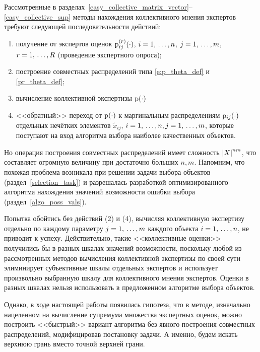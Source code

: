 Рассмотренные в разделах~\ref{easy_collective_matrix_vector}--\ref{easy_collective_sup} методы нахождения коллективного мнения экспертов требуют следующей последовательности действий: 
\begin{enumerate}
\item получение от экспертов оценок ${\mathrm{p}}_{ij}^{(r)}(\cdot)$, $i = 1,\, \ldots, n$, $j = 1,\, \ldots, m$, $r = 1,\, \ldots, R$ (проведение экспертного опроса);
\item построение совместных распределений типа \eqref{e:p_theta_def} и \eqref{pr_theta_def};
\item вычисление коллективной экспертизы  ${\mathrm{p}}(\cdot)$
\item<<обратный>> переход от ${\mathrm{p}}(\cdot)$ к маргинальным распределениям ${\mathrm{p}}_{ij}(\cdot)$ отдельных нечётких элементов $\tilde x_{ij}$, $i = 1,\, \ldots, n, j = 1,\, \ldots, m$, которые поступают на вход алгоритма выбора наиболее качественных объектов. %
\end{enumerate}

Но операция построения  совместных распределений имеет сложность $\left| X \right|^{nm}$, что составляет огромную величину при достаточно больших $n, m$. Напомним, что похожая проблема возникала при решении задачи выбора объектов (раздел~\ref{selection_task}) и разрешалась разработкой оптимизированного алгоритма нахождения значений возможности ошибки выбора (раздел~\ref{algo_poss_vals}). %

Попытка обойтись без действий (2) и (4), вычисляя коллективную экспертизу отдельно по каждому параметру $j = 1,\, \ldots, m$ каждого объекта $i = 1,\, \ldots, n$, не приводит к успеху. Действительно, такие <<коллективные оценки>> получились бы в разных шкалах значений возможности, поскольку любой из рассмотренных методов вычисления коллективной экспертизы по своей сути элиминирует субъективные шкалы отдельных экспертов и использует произвольно выбранную шкалу для коллективного мнения экспертов. Оценки в разных шкалах нельзя использовать в предложенном алгоритме выбора объектов.

Однако, в ходе настоящей работы появилась гипотеза, что в методе, изначально нацеленном на  вычисление супремума множества экспертных оценок, можно построить <<быстрый>> вариант алгоритма без явного построения совместных распределений, модифицировав постановку задачи. А именно, будем искать верхнюю грань вместо точной верхней грани. %

